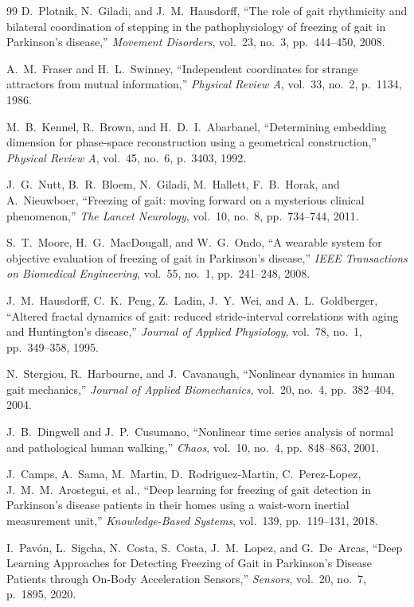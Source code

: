 \documentclass[12pt,a4paper,oneside]{report}
\numberwithin{equation}{chapter}
\numberwithin{figure}{chapter}
\numberwithin{table}{chapter}
\begin{document}
\begin{thebibliography}{99}
D.~Plotnik, N.~Giladi, and J.~M.~Hausdorff, ``The role of gait rhythmicity and bilateral coordination of stepping in the pathophysiology of freezing of gait in Parkinson's disease,'' \textit{Movement Disorders}, vol.~23, no.~3, pp.~444--450, 2008.

A.~M.~Fraser and H.~L.~Swinney, ``Independent coordinates for strange attractors from mutual information,'' \textit{Physical Review A}, vol.~33, no.~2, p.~1134, 1986.

M.~B.~Kennel, R.~Brown, and H.~D.~I.~Abarbanel, ``Determining embedding dimension for phase-space reconstruction using a geometrical construction,'' \textit{Physical Review A}, vol.~45, no.~6, p.~3403, 1992.

J.~G.~Nutt, B.~R.~Bloem, N.~Giladi, M.~Hallett, F.~B.~Horak, and A.~Nieuwboer, ``Freezing of gait: moving forward on a mysterious clinical phenomenon,'' \textit{The Lancet Neurology}, vol.~10, no.~8, pp.~734--744, 2011.

S.~T.~Moore, H.~G.~MacDougall, and W.~G.~Ondo, ``A wearable system for objective evaluation of freezing of gait in Parkinson's disease,'' \textit{IEEE Transactions on Biomedical Engineering}, vol.~55, no.~1, pp.~241--248, 2008.

J.~M.~Hausdorff, C.~K.~Peng, Z.~Ladin, J.~Y.~Wei, and A.~L.~Goldberger, ``Altered fractal dynamics of gait: reduced stride-interval correlations with aging and Huntington's disease,'' \textit{Journal of Applied Physiology}, vol.~78, no.~1, pp.~349--358, 1995.

N.~Stergiou, R.~Harbourne, and J.~Cavanaugh, ``Nonlinear dynamics in human gait mechanics,'' \textit{Journal of Applied Biomechanics}, vol.~20, no.~4, pp.~382--404, 2004.

J.~B.~Dingwell and J.~P.~Cusumano, ``Nonlinear time series analysis of normal and pathological human walking,'' \textit{Chaos}, vol.~10, no.~4, pp.~848--863, 2001.

J.~Camps, A.~Sama, M.~Martin, D.~Rodriguez-Martin, C.~Perez-Lopez, J.~M.~M.~Arostegui, et al., ``Deep learning for freezing of gait detection in Parkinson's disease patients in their homes using a waist-worn inertial measurement unit,'' \textit{Knowledge-Based Systems}, vol.~139, pp.~119--131, 2018.

I.~Pav\'{o}n, L.~Sigcha, N.~Costa, S.~Costa, J.~M.~Lopez, and G.~De~Arcas, ``Deep Learning Approaches for Detecting Freezing of Gait in Parkinson's Disease Patients through On-Body Acceleration Sensors,'' \textit{Sensors}, vol.~20, no.~7, p.~1895, 2020.


\end{thebibliography}
\end{document}
